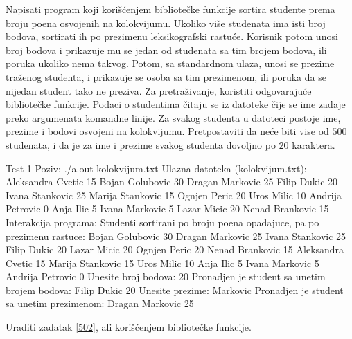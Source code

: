 \begin{Answer}[ref=520]
\end{Answer}
\begin{Exercise}[label=521]
  Napisati program koji korišćenjem bibliotečke funkcije 
  sortira studente prema broju poena osvojenih na kolokvijumu. Ukoliko
  više studenata ima isti broj bodova, sortirati ih po prezimenu
  leksikografski rastuće. Korisnik potom unosi broj bodova i prikazuje
  mu se jedan od studenata sa tim brojem bodova, ili poruka ukoliko
  nema takvog. Potom, sa standardnom ulaza, unosi se prezime traženog
  studenta, i prikazuje se osoba sa tim prezimenom, ili poruka da se
  nijedan student tako ne preziva. Za pretraživanje, koristiti
  odgovarajuće bibliotečke funkcije. Podaci o studentima čitaju se iz
  datoteke čije se ime zadaje preko argumenata komandne linije. Za
  svakog studenta u datoteci postoje ime, prezime i bodovi osvojeni na
  kolokvijumu. Pretpostaviti da neće biti vise od $500$ studenata, i
  da je za ime i prezime svakog studenta dovoljno po $20$ karaktera.
  
\begin{maxitest}
\begin{test}{Test 1}
Poziv:  ./a.out kolokvijum.txt
Ulazna datoteka (kolokvijum.txt):
  Aleksandra Cvetic 15
  Bojan Golubovic 30
  Dragan Markovic 25
  Filip Dukic 20 
  Ivana Stankovic 25
  Marija Stankovic 15 
  Ognjen Peric 20
  Uros Milic 10
  Andrija Petrovic 0
  Anja Ilic 5
  Ivana Markovic 5
  Lazar Micic 20
  Nenad Brankovic 15
Interakcija programa:
  Studenti sortirani po broju poena opadajuce, pa po prezimenu rastuce:
  Bojan Golubovic  30
  Dragan Markovic  25
  Ivana Stankovic  25
  Filip Dukic  20
  Lazar Micic  20
  Ognjen Peric  20
  Nenad Brankovic  15
  Aleksandra Cvetic  15
  Marija Stankovic  15
  Uros Milic  10
  Anja Ilic  5
  Ivana Markovic  5
  Andrija Petrovic  0
  Unesite broj bodova: 20
  Pronadjen je student sa unetim  brojem bodova: Filip Dukic 20
  Unesite prezime: Markovic
  Pronadjen je student sa unetim prezimenom: Dragan Markovic 25
\end{test}
\end{maxitest}
  
\end{Exercise}

\begin{Answer}[ref=521]
\end{Answer}
\begin{Exercise}[label=522]
  Uraditi zadatak \ref{502}, ali korišćenjem bibliotečke 
  funkcije.
  
\end{Exercise}

